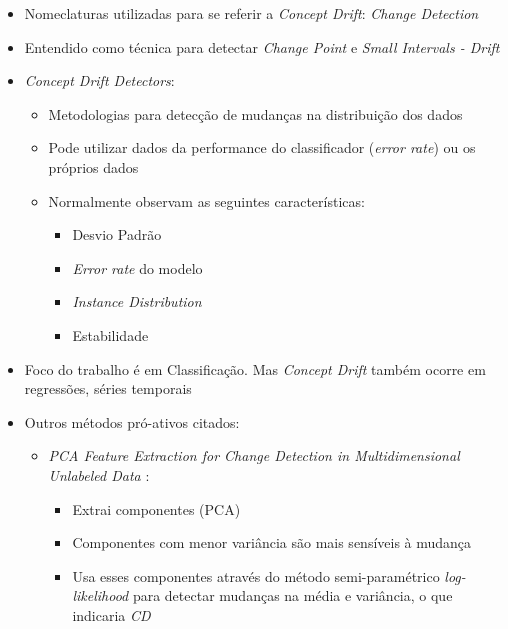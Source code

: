 \documentclass[qual, classic, a4paper]{ufbathesis}
\begin{document}
\begin{itemize}
    \item Nomeclaturas utilizadas para se referir a \textit{Concept Drift}: \textit{Change Detection}
    \item Entendido como técnica para detectar \textit{Change Point}  e \textit{Small Intervals - Drift}
    \item \textit{Concept Drift Detectors}:
    \begin{itemize}
        \item Metodologias para detecção de mudanças na distribuição dos dados
        \item Pode utilizar dados da performance do classificador (\textit{error rate}) ou os próprios dados
        \item Normalmente observam as seguintes características:
        \begin{itemize}
            \item Desvio Padrão
            \item \textit{Error rate} do modelo
            \item \textit{Instance Distribution}
            \item Estabilidade
        \end{itemize}
    \end{itemize}

    \item Foco do trabalho é em Classificação. Mas \textit{Concept Drift} também ocorre em regressões, séries temporais
    \item Outros métodos pró-ativos citados:
    \begin{itemize}
        \item \textit{PCA Feature Extraction for Change Detection in Multidimensional Unlabeled Data} \cite{PCAFeatureExtractionChangeDetection}: 
        \begin{itemize}
            \item Extrai componentes (PCA)
            \item Componentes com menor variância são mais sensíveis à mudança
            \item Usa esses componentes através do método semi-paramétrico \textit{log-likelihood} para detectar mudanças na média e variância, o que indicaria \textit{CD}
        \end{itemize}


\end{itemize}
\end{itemize}
\end{document}
